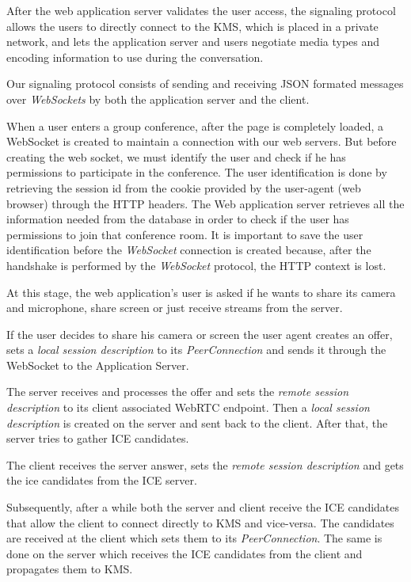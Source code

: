 \documentclass[conference,compsoc,a4paper]{IEEEtran}
\begin{document}
After the web application server validates the user access, the signaling protocol allows the users to directly connect to the \gls{KMS}, which is placed in a private network, and lets the application server and users negotiate media types and encoding information to use during the conversation.

Our signaling protocol consists of sending and receiving \gls{JSON} formated messages over \emph{WebSockets} by both the application server and the client. 


When a user enters a group conference, after the page is completely loaded, a WebSocket is created to maintain a connection with our web servers. 
But before creating the web socket, we must identify the user and check if he has permissions to participate in the conference. The user identification is done by retrieving the session id from the cookie provided by the user-agent (web browser) through the \gls{HTTP} headers.
The Web application server retrieves all the information needed from the database in order to check if the user has permissions to join that conference room. It is important to save the user identification before the \emph{WebSocket} connection is created because, after the handshake is performed by the \emph{WebSocket} protocol\cite{rfc6455}, the \gls{HTTP} context is lost.

At this stage, the web application's user is asked if he wants to share its camera and microphone, share screen or just receive streams from the server. 

If the user decides to share his camera or screen the user agent creates an offer, sets a \emph{local session description} to its \emph{PeerConnection} and sends it through the WebSocket to the Application Server.

The server receives and processes the offer and sets the \emph{remote session description} to its client associated \gls{WebRTC} endpoint. Then a \emph{local session description} is created on the server and sent back to the client. After that, the server tries to gather \gls{ICE} candidates.

The client receives the server answer, sets the \emph{remote session description} and gets the ice candidates from the \gls{ICE} server.

Subsequently, after a while both the server and client receive the \gls{ICE} candidates that allow the client to connect directly to \gls{KMS} and vice-versa. The candidates are received at the client which sets them to its \emph{PeerConnection}. The same is done on the server which receives the \gls{ICE} candidates from the client and propagates them to \gls{KMS}.
\end{document}

